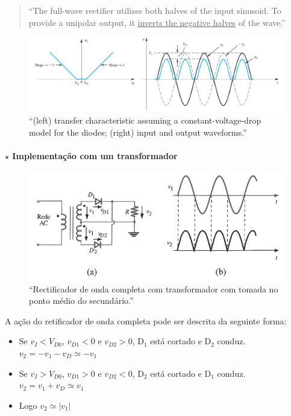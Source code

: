 \begin{quote}
    ``The full-wave rectifier utilizes both halves of the input sinusoid. To provide a unipolar output,
    it \underline{inverts the negative halves} of the wave.''\cite{sedra-smith:microelectronic-circuits}
\end{quote}

\begin{figure}[H]
    \centering
    \includegraphics[width=1\linewidth]{img/2/exemplo-full-wave-rectifier.png}
    \caption{``(left) transfer characteristic assuming a constant-voltage-drop model for the diodes; (right) input and output waveforms.''\cite{sedra-smith:microelectronic-circuits}}
    \label{fig:exemplo-full-wave-rectifier}
\end{figure}

\paragraph[2.2.1.1 Implementação com um transformador]{$\pmb{\star}$ Implementação com um transformador}\mbox{}

\begin{figure}[H]
    \centering
    \includegraphics[width = 0.8\linewidth]{img/2/onda-completa-transformador.png}
    \caption{``Rectificador de onda completa com transformador com tomada no ponto médio do secundário.''\cite{medeiros:ICEE}}
    \label{fig:onda-completa-transformador}
\end{figure}

\noindent A ação do retificador de onda completa pode ser descrita da seguinte forma:
\begin{itemize}[leftmargin=*]
    \item Se $v_I < V_{D0}$, $v_{D1} < 0$ e $v_{D2} > 0$, D$_1$ está cortado e D$_2$ conduz. $v_2 = -v_1 - v_D \simeq - v_1$
    \item Se $v_I > V_{D0}$, $v_{D1} > 0$ e $v_{D2} < 0$, D$_2$ está cortado e D$_1$ conduz. $v_2 = v_1 + v_D \simeq  v_1$
    \item Logo $v_2 \simeq |v_1|$
\end{itemize}


